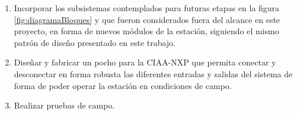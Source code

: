 \begin{enumerate}
  \item Incorporar los subsistemas contemplados para futuras etapas en la figura \ref{fig:diagramaBloques} y que fueron considerados fuera del alcance en este proyecto, en forma de nuevos módulos de la estación, siguiendo el mismo patrón de diseño presentado en este trabajo.
  \item Diseñar y fabricar un pocho para la CIAA-NXP que permita conectar y desconectar en forma robusta las diferentes entradas y salidas del sistema de forma de poder operar la estación en condiciones de campo.
  \item Realizar pruebas de campo. 
\end{enumerate}


